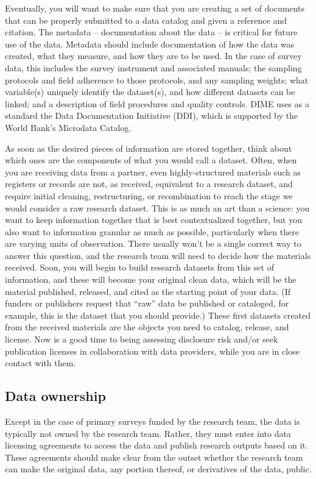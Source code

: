 Eventually, you will want to make sure that you are creating a set of documents
that can be properly submitted to a data catalog and given a reference and citation.
The metadata -- documentation about the data -- is critical for future use of the data.
Metadata should include documentation of how the data was created,
what they measure, and how they are to be used.
In the case of survey data, this includes the survey instrument and associated manuals;
the sampling protocols and field adherence to those protocols, and any sampling weights;
what variable(s) uniquely identify the dataset(s), and how different datasets can be linked;
and a description of field procedures and quality controls.
DIME uses as a standard the Data Documentation Initiative (DDI), which is supported by the
World Bank's Microdata Catalog.

As soon as the desired pieces of information are stored together,
think about which ones are the components of what you would call a dataset.
Often, when you are receiving data from a partner,
even highly-structured materials such as registers or records
are not, as received, equivalent to a research dataset,
and require initial cleaning, restructuring, or recombination
to reach the stage we would consider a raw research dataset.
This is as much an art than a science:
you want to keep information together that is best contextualized together,
but you also want to information granular as much as possible,
particularly when there are varying units of observation.
There usually won't be a single correct way to answer this question,
and the research team will need to decide how the materials received.
Soon, you will begin to build research datasets from this set of information,
and these will become your original clean data,
which will be the material published, released, and cited 
as the starting point of your data.
(If funders or publishers request that ``raw'' data be published or cataloged,
for example, this is the dataset that you should provide.)
These first datasets created from the received materials
are the objects you need to catalog, release, and license.
Now is a good time to being assessing disclosure risk
and/or seek publication licenses in collaboration with data providers,
while you are in close contact with them.

\subsection{Data ownership}
Except in the case of primary surveys funded by the research team,
the data is typically not owned by the research team.
Rather, they must enter into data licensing agreements
to access the data and publish research outputs based on it.
These agreements should make clear from the outset whether the
research team can make the original data, any portion thereof, or derivatives
of the data, public.

